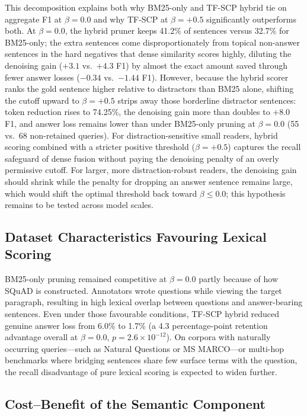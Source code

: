 \documentclass[conference]{IEEEtran}
\begin{document}
This decomposition explains both why BM25-only and TF-SCP hybrid tie on aggregate F1 at $\beta = 0.0$ and why TF-SCP at $\beta = +0.5$ significantly outperforms both. At $\beta = 0.0$, the hybrid pruner keeps 41.2\% of sentences versus 32.7\% for BM25-only; the extra sentences come disproportionately from topical non-answer sentences in the hard negatives that dense similarity scores highly, diluting the denoising gain ($+3.1$ vs.\ $+4.3$ F1) by almost the exact amount saved through fewer answer losses ($-0.34$ vs.\ $-1.44$ F1). However, because the hybrid scorer ranks the gold sentence higher relative to distractors than BM25 alone, shifting the cutoff upward to $\beta = +0.5$ strips away those borderline distractor sentences: token reduction rises to 74.25\%, the denoising gain more than doubles to $+8.0$ F1, and answer loss remains lower than under BM25-only pruning at $\beta = 0.0$ (55 vs.\ 68 non-retained queries). For distraction-sensitive small readers, hybrid scoring combined with a stricter positive threshold ($\beta = +0.5$) captures the recall safeguard of dense fusion without paying the denoising penalty of an overly permissive cutoff. For larger, more distraction-robust readers, the denoising gain should shrink while the penalty for dropping an answer sentence remains large, which would shift the optimal threshold back toward $\beta \le 0.0$; this hypothesis remains to be tested across model scales.

\subsection{Dataset Characteristics Favouring Lexical Scoring}

BM25-only pruning remained competitive at $\beta = 0.0$ partly because of how SQuAD is constructed. Annotators wrote questions while viewing the target paragraph, resulting in high lexical overlap between questions and answer-bearing sentences. Even under those favourable conditions, TF-SCP hybrid reduced genuine answer loss from 6.0\% to 1.7\% (a 4.3 percentage-point retention advantage overall at $\beta = 0.0$, $p = 2.6 \times 10^{-12}$). On corpora with naturally occurring queries---such as Natural Questions or MS MARCO---or multi-hop benchmarks where bridging sentences share few surface terms with the question, the recall disadvantage of pure lexical scoring is expected to widen further.

\subsection{Cost--Benefit of the Semantic Component}
\end{document}
